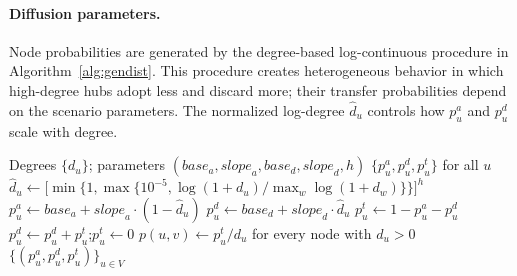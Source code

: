 \documentclass[sigconf,balance=false]{acmart}
\begin{document}
\begin{table}[t]
  \caption{Datasets used in the experiments.}
  \label{tab:datasets}
  \centering
\end{table}

\paragraph{Diffusion parameters.}
Node probabilities are generated by the degree-based log-continuous
procedure in Algorithm~\ref{alg:gendist}. This procedure creates
heterogeneous behavior in which high-degree hubs adopt less and discard more;
their transfer probabilities depend on the scenario parameters.
The normalized log-degree $\hat{d}_u$ controls how $p_u^a$ and $p_u^d$
scale with degree.

\begin{algorithm}[t]
\caption{Degree-Based Node Probability Generation}
\label{alg:gendist}
\begin{algorithmic}[1]
\Require Degrees $\{d_u\}$; parameters
  $(\mathit{base}_a, \mathit{slope}_a, \mathit{base}_d,
    \mathit{slope}_d, h)$
\Ensure $\{p_u^a, p_u^d, p_u^t\}$ for all $u$
  \State $\hat{d}_u \gets
    \bigl[\min\{1,\max\{10^{-5},
    \log(1{+}d_u)/\max_w\log(1{+}d_w)\}\}\bigr]^h$
\EndFor
{}
  \State $p_u^a \gets \mathit{base}_a
    + \mathit{slope}_a \cdot (1-\hat{d}_u)$
  \State $p_u^d \gets \mathit{base}_d
    + \mathit{slope}_d \cdot \hat{d}_u$
  \State $p_u^t \gets 1 - p_u^a - p_u^d$
    \State $p_u^d\gets p_u^d+p_u^t$;\quad $p_u^t\gets0$
  \EndIf
\EndFor
\State $p(u,v) \gets p_u^t / d_u$ for every node with $d_u>0$
\State \Return $\{(p_u^a, p_u^d, p_u^t)\}_{u\in V}$
\end{algorithmic}
\end{algorithm}
\end{document}
